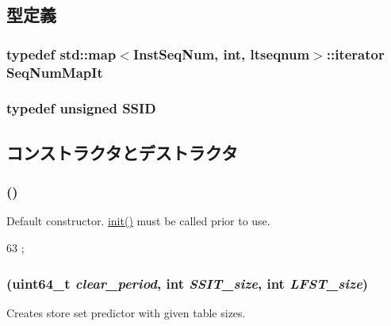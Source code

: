 \subsection{型定義}
\hypertarget{classStoreSet_afaca5122d48a680d2adb3b6f841528eb}{
\subsubsection[{SeqNumMapIt}]{\setlength{\rightskip}{0pt plus 5cm}typedef std::map$<${\bf InstSeqNum}, int, {\bf ltseqnum}$>$::iterator {\bf SeqNumMapIt}}}
\label{classStoreSet_afaca5122d48a680d2adb3b6f841528eb}
\hypertarget{classStoreSet_a3cffbd955ca25d7d74d98168c6ea2404}{
\subsubsection[{SSID}]{\setlength{\rightskip}{0pt plus 5cm}typedef unsigned {\bf SSID}}}
\label{classStoreSet_a3cffbd955ca25d7d74d98168c6ea2404}


\subsection{コンストラクタとデストラクタ}
\hypertarget{classStoreSet_ab4658accf641bb529cfd0d8a86ac1985}{
\subsubsection[{StoreSet}]{ ()}}
\label{classStoreSet_ab4658accf641bb529cfd0d8a86ac1985}
Default constructor. \hyperlink{classStoreSet_a4976b4794b30eada21534d7238044c68}{init()} must be called prior to use. 


\begin{DoxyCode}
63 { };
\end{DoxyCode}
\hypertarget{classStoreSet_a31e067a1c435ba8158c230dfe3348839}{
\subsubsection[{StoreSet}]{ (uint64\_\-t {\em clear\_\-period}, \/  int {\em SSIT\_\-size}, \/  int {\em LFST\_\-size})}}
\label{classStoreSet_a31e067a1c435ba8158c230dfe3348839}
Creates store set predictor with given table sizes. 


